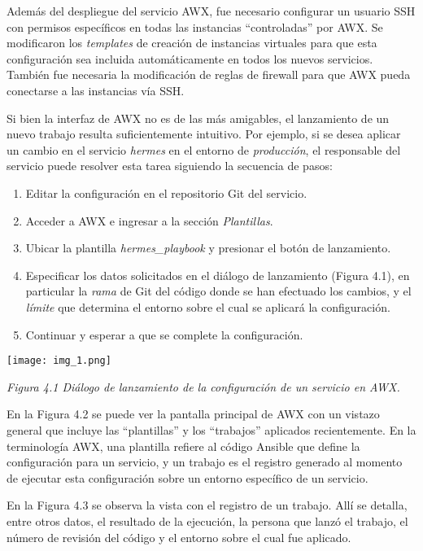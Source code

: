 Además del despliegue del servicio AWX, fue necesario configurar un usuario SSH con permisos específicos en todas las instancias “controladas” por AWX. Se modificaron los \textit{templates} de creación de instancias virtuales para que esta configuración sea incluida automáticamente en todos los nuevos servicios. También fue necesaria la modificación de reglas de firewall para que AWX pueda conectarse a las instancias vía SSH.

Si bien la interfaz de AWX no es de las más amigables, el lanzamiento de un nuevo trabajo resulta suficientemente intuitivo. Por ejemplo, si se desea aplicar un cambio en el servicio \textit{hermes} en el entorno de \textit{producción}, el responsable del servicio puede resolver esta tarea siguiendo la secuencia de pasos:

\begin{enumerate}
\item Editar la configuración en el repositorio Git del servicio.
\item Acceder a AWX e ingresar a la sección \textit{Plantillas}.
\item Ubicar la plantilla \textit{hermes\_playbook} y presionar el botón de lanzamiento.
\item Especificar los datos solicitados en el diálogo de lanzamiento (Figura 4.1), en particular la \textit{rama} de Git del código donde se han efectuado los cambios, y el \textit{límite} que determina el entorno sobre el cual se aplicará la configuración.
\item Continuar y esperar a que se complete la configuración.
\end{enumerate}
\texttt{[image: img\_1.png]}


\textit{Figura 4.1 Diálogo de lanzamiento de la configuración de un servicio en AWX.}

En la Figura 4.2 se puede ver la pantalla principal de AWX con un vistazo general que incluye las “plantillas” y los “trabajos” aplicados recientemente. En la terminología AWX, una plantilla refiere al código Ansible que define la configuración para un servicio, y un trabajo es el registro generado al momento de ejecutar esta configuración sobre un entorno específico de un servicio.

En la Figura 4.3 se observa la vista con el registro de un trabajo. Allí se detalla, entre otros datos, el resultado de la ejecución, la persona que lanzó el trabajo, el número de revisión del código y el entorno sobre el cual fue aplicado.


